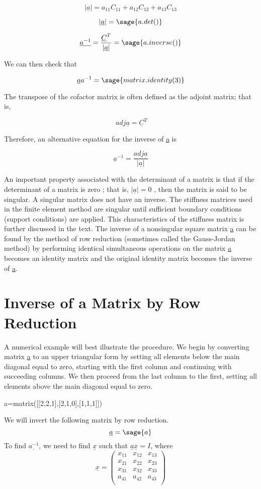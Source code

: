 \documentclass[12pt]{report}
\begin{document}
$$|\underline{a}|=a_{11}C_{11}+a_{12}C_{12}+a_{13}C_{13} $$

$$ |\underline{a}| = \sage{a.det()}$$

$$ \underline{a^{-1}}=\frac{\underline{C}^T}{|\underline{a}|}=\sage{a.inverse()} $$

We can then check that

$$\underline{a}{a}^{-1}=\sage{matrix.identity(3)}$$


The transpose of the cofactor matrix is often defined as the adjoint
matrix; that is,

$$\ adj\underline{a}=\underline{C}^T $$

Therefore, an alternative equation for the inverse of \underline{a} is


$$\underline{a}^{-1}=\frac {adj \underline{a}}{|\underline{a}|}$$


An important property associated with the determinant of a matrix is
that if the determinant of a matrix is zero ; that is,
$|\underline{a}| =0$ , then the matrix is said to be singular. A
singular matrix does not have an inverse. The stiffness matrices used
in the finite element method are singular until sufficient boundary
conditions (support conditions) are applied. This characteristics of
the stiffness matrix is further discussed in the text.
The inverse of a nonsingular square matrix \underline{a} can be found
by the method of row reduction (sometimes called the Gauss-Jordan
method) by performing identical simultaneous operations on the matrix
\underline{a} becomes an identity matrix and the original identity
matrix becomes the inverse of \underline{a}.

\section{Inverse of a Matrix by Row Reduction}
A numerical example will best illustrate the procedure. We begin by
converting matrix \underline{a} to an upper triangular form by setting
all elements below the main diagonal equal to zero, starting with the
first column and continuing with succeeding columns. We then proceed
from the last column to the first, setting all elements above the main
diagonal equal to zero.
\begin{sagesilent}
a=matrix([[2,2,1],[2,1,0],[1,1,1]])
\end{sagesilent}
We will invert the following matrix by row reduction.
$$\underline{a} = \sage{a}$$
To find $\underline{a^{-1}}$, we need to find $\underline{x}$ such that
$\underline{a}\underline{x}=I$, where
$$\underline{x}=\left(\begin{array}{rrr}
x_{11} & x_{12} & x_{13} \\
x_{21} & x_{22} & x_{23} \\
x_{31} & x_{32} & x_{33} \\
a_{41} & a_{42} & a_{43}  \\
\end{array}\right)$$
\end{document}
